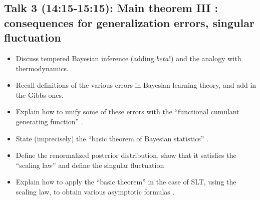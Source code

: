 \documentclass[a4paper,11pt]{amsart}
\begin{document}
\subsection*{Talk 3 (14:15-15:15): Main theorem III : consequences for generalization errors, singular fluctuation}

\begin{itemize}
\item Discuss tempered Bayesian inference (adding $beta$!) and the analogy with thermodynamics.  
\item Recall definitions of the various errors in Bayesian learning theory, and add in the Gibbs ones.
\item Explain how to unify some of these errors with the ``functional cumulant generating function'' \cite[\S 3.3]{green-book}.
\item State (imprecisely) the ``basic theorem of Bayesian statistics'' \cite[\S 3.4 Theorem 3]{green-book}.
\item Define the renormalized posterior distribution, show that it satisfies the ``scaling law'' and define the singular fluctuation \cite[\S 5.4 and \S 6.3]{green-book}
\item Explain how to apply the ``basic theorem'' in the case of SLT, using the scaling law, to obtain various asymptotic formulas \cite[\S 5.4 and \S 6.3]{green-book}.
\end{itemize}
\end{document}
